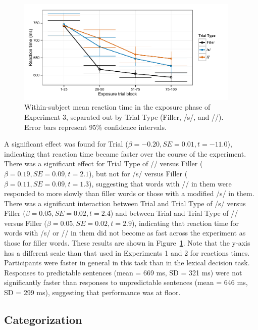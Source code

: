 \begin{figure}[!ht]
\centering
\caption{Within-subject mean reaction time in the exposure phase of Experiment 3, separated out by Trial Type (Filler, /s/, and /\textesh/). Error bars represent 95\% confidence intervals.}
\label{fig:exp3exposert}
\begin{center}
\includegraphics[width=0.95\textwidth]{graphs/exp3_exprt}
\end{center}
\end{figure}

A significant effect was found for Trial ($\beta = -0.20, SE = 0.01, t = -11.0$), indicating that reaction time became faster over the course of the experiment.
There was a significant effect for Trial Type of /\textesh/ versus Filler ($\beta = 0.19, SE = 0.09, t = 2.1$), but not for /s/ versus Filler ($\beta = 0.11, SE = 0.09, t = 1.3$), suggesting that words with /\textesh/ in them were responded to more slowly than filler words or those with a modified /s/ in them.
There was a significant interaction between Trial and Trial Type of  /s/ versus Filler ($\beta = 0.05, SE = 0.02, t = 2.4$) and between Trial and Trial Type of /\textesh/ versus Filler ($\beta = 0.05, SE = 0.02, t = 2.9$), indicating that reaction time for words with /s/ or /\textesh/ in them did not become as fast across the experiment as those for filler words.
These results are shown in Figure~\ref{fig:exp3exposert}.
Note that the y-axis has a different scale than that used in Experiments 1 and 2 for reactions times.
Participants were faster in general in this task than in the lexical decision task.
Responses to predictable sentences (mean = 669 ms, SD = 321 ms) were not significantly faster than responses to unpredictable sentences (mean = 646 ms, SD = 299 ms), suggesting that performance was at floor.


\subsection{Categorization}

